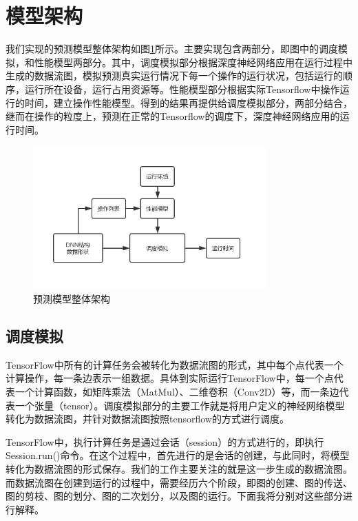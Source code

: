 \section{模型架构}    
    我们实现的预测模型整体架构如图\ref{fig:arch}所示。主要实现包含两部分，即图中的调度模拟，和性能模型两部分。其中，调度模拟部分根据深度神经网络应用在运行过程中生成的数据流图，模拟预测真实运行情况下每一个操作的运行状况，包括运行的顺序，运行所在设备，运行占用资源等。性能模型部分根据实际Tensorflow中操作运行的时间，建立操作性能模型。得到的结果再提供给调度模拟部分，两部分结合，继而在操作的粒度上，预测在正常的Tensorflow的调度下，深度神经网络应用的运行时间。
    
    \begin{figure}[!htbp]
        \centering
        \includegraphics[width=0.8\textwidth]{figures/arch.jpg}
        \caption{预测模型整体架构}
        \label{fig:arch}
    \end{figure}

\subsection{调度模拟}
    TensorFlow中所有的计算任务会被转化为数据流图的形式，其中每个点代表一个计算操作，每一条边表示一组数据。具体到实际运行TensorFlow中，每一个点代表一个计算函数，如矩阵乘法（MatMul）、二维卷积（Conv2D）等，而一条边代表一个张量（tensor）。调度模拟部分的主要工作就是将用户定义的神经网络模型转化为数据流图，并针对数据流图按照tensorflow的方式进行调度。
    
    TensorFlow中，执行计算任务是通过会话（session）的方式进行的，即执行Session.run()命令。在这个过程中，首先进行的是会话的创建，与此同时，将模型转化为数据流图的形式保存。我们的工作主要关注的就是这一步生成的数据流图。而数据流图在创建到运行的过程中，需要经历六个阶段，即图的创建、图的传送、图的剪枝、图的划分、图的二次划分，以及图的运行。下面我将分别对这些部分进行解释。
    
